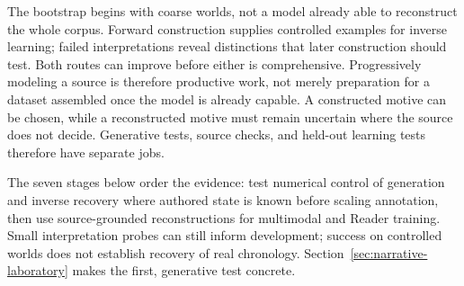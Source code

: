 \documentclass[10pt]{article}
\begin{document}
The bootstrap begins with coarse worlds, not a model already able to
reconstruct the whole corpus. Forward construction supplies controlled examples
for inverse learning; failed interpretations reveal distinctions that later
construction should test. Both routes can improve before either is
comprehensive. Progressively modeling a source is therefore productive work,
not merely preparation for a dataset assembled once the model is already
capable. A constructed motive can be chosen, while a reconstructed motive
must remain uncertain where the source does not decide. Generative tests,
source checks, and held-out learning tests therefore have separate jobs.

The seven stages below order the evidence: test numerical control of generation
and inverse recovery where authored state is known before scaling annotation,
then use source-grounded reconstructions for multimodal and Reader training.
Small interpretation probes can still inform development; success on
controlled worlds does not establish recovery of real chronology.
Section~\ref{sec:narrative-laboratory} makes the first, generative test concrete.
\end{document}

